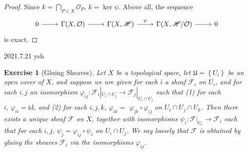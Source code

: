 \documentclass{amsart}
\newtheorem{exe}{Exercise}[subsection]
\begin{document}
\begin{proof}
	Since $k=\bigcap_{P\in X}\mathcal{O}_P$, $k=\ker\psi$. Above all, the sequence
	\begin{equation*}
		\begin{tikzcd}
			0 \arrow[r] & {\Gamma(X,\mathcal{O})} \arrow[r] & {\Gamma(X,\mathscr{H})} \arrow[r, "\psi"] & {\Gamma(X,\mathscr{H}/\mathcal{O})} \arrow[r] & 0
		\end{tikzcd}
	\end{equation*}
	is exact.
\end{proof}

2021.7.21 ysh

\begin{exe}[Gluing Sheaves]
	\label{2.1.22}
	Let $X$ be a topological space, let $\mathfrak{U}=\left\{U_{i}\right\}$ be an open cover of $X$, and suppose we are given for each $i$ a sheaf $\mathscr{F}_{i}$ on $U_{i}$, and for each $i, j$ an isomorphism $\varphi_{i j}:\mathscr{F}_{i}|_{U_{i} \cap U_{j}} \rightarrow \mathscr{F}_{j}|_{U_{i} \cap U_{j}}$ such that
	(1) for each $i,\ \varphi_{i i}=\mathrm{id}$, and
	(2) for each $i, j, k,\ \varphi_{i k}=$ $\varphi_{j k} \circ \varphi_{i j}$ on $U_{i} \cap U_{j} \cap U_{k} $. Then there exists a unique sheaf $\mathscr{F}$ on $X$, together with isomorphisms $\psi_{i}:\mathscr{F}|_{U_{i}} \rightarrow \mathscr{F}_{i}$ such that for each $i, j,\ \psi_{j}=\varphi_{i j} \circ \psi_{i}$ on $U_{i} \cap U_{j}$. We say loosely that $\mathscr{F}$ is
	obtained by gluing the sheaves $\mathscr{F}_{i}$ via the isomorphisms $\varphi_{i j}$.
\end{exe}
\end{document}
